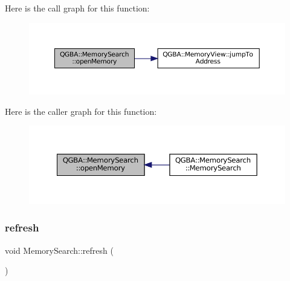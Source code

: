 Here is the call graph for this function\+:
\nopagebreak
\begin{figure}[H]
\begin{center}
\leavevmode
\includegraphics[width=350pt]{class_q_g_b_a_1_1_memory_search_a53bcce6f42eba9e70d695fd20be8b50f_cgraph}
\end{center}
\end{figure}
Here is the caller graph for this function\+:
\nopagebreak
\begin{figure}[H]
\begin{center}
\leavevmode
\includegraphics[width=350pt]{class_q_g_b_a_1_1_memory_search_a53bcce6f42eba9e70d695fd20be8b50f_icgraph}
\end{center}
\end{figure}
\mbox{\label{class_q_g_b_a_1_1_memory_search_a164cb44bd1de9560f3d8d7b892167e5c}} 
\subsubsection{\texorpdfstring{refresh}{refresh}}
{\footnotesize\ttfamily void Memory\+Search\+::refresh (\begin{DoxyParamCaption}{ }\end{DoxyParamCaption})\hspace{0.3cm}{\ttfamily [slot]}}


